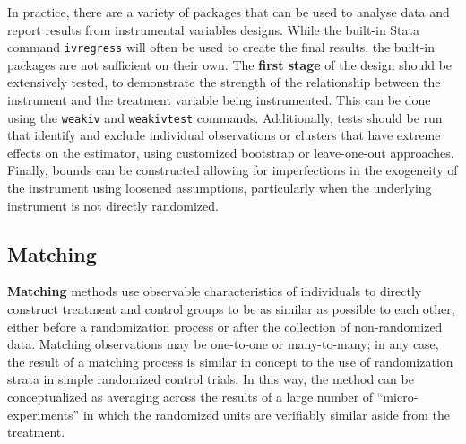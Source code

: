 In practice, there are a variety of packages that can be used
to analyse data and report results from instrumental variables designs.
While the built-in Stata command \texttt{ivregress} will often be used
to create the final results, the built-in packages are not sufficient on their own.
The \textbf{first stage} of the design should be extensively tested,
to demonstrate the strength of the relationship between
the instrument and the treatment variable being instrumented.\cite{stock2005weak}
This can be done using the \texttt{weakiv} and \texttt{weakivtest} commands.\cite{pfluegerwang2015}
Additionally, tests should be run that identify and exclude individual
observations or clusters that have extreme effects on the estimator,
using customized bootstrap or leave-one-out approaches.\cite{young2017consistency}
Finally, bounds can be constructed allowing for imperfections
in the exogeneity of the instrument using loosened assumptions,
particularly when the underlying instrument is not directly randomized.\cite{clarke2018}


\subsection{Matching}

\textbf{Matching} methods use observable characteristics of individuals
to directly construct treatment and control groups to be as similar as possible
to each other, either before a randomization process
or after the collection of non-randomized data.
Matching observations may be one-to-one or many-to-many;
in any case, the result of a matching process
is similar in concept to the use of randomization strata
in simple randomized control trials.
In this way, the method can be conceptualized
as averaging across the results of a large number of ``micro-experiments''
in which the randomized units are verifiably similar aside from the treatment.

